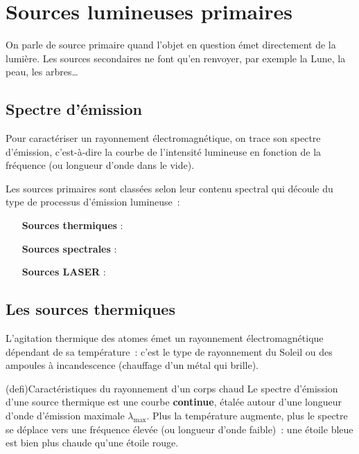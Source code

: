 \documentclass[../../main/main.tex]{subfiles}
\begin{document}
\section{Sources lumineuses primaires}

On parle de source primaire quand l'objet en question émet directement de la
lumière. Les sources secondaires ne font qu'en renvoyer, par exemple la Lune, la
peau, les arbres…

\subsection{Spectre d'émission}

Pour caractériser un rayonnement électromagnétique, on trace son spectre
d'émission, c'est-à-dire la courbe de l'intensité lumineuse en fonction de la
fréquence (ou longueur d'onde dans le vide).

Les sources primaires sont classées selon leur contenu spectral
qui découle du type de processus d'émission lumineuse~:
\begin{itemize}[leftmargin=120pt]
	\item[\textbf{Sources thermiques}] : 
	\item[\textbf{Sources spectrales}] : 
	\item[\textbf{Sources LASER}] : 
\end{itemize}

\subsection{Les sources thermiques}

L'agitation thermique des atomes émet un rayonnement électromagnétique dépendant
de sa température~: c'est le type de rayonnement du Soleil ou des ampoules à
incandescence (chauffage d'un métal qui brille).

\begin{tcb}(defi){Caractéristiques du rayonnement d'un corps chaud}
	Le spectre d'émission d'une source thermique est une courbe
	\textbf{continue}, étalée autour d'une longueur d'onde d'émission maximale
	$\lambda_{\max}$. Plus la température augmente, plus le spectre se déplace vers
	une fréquence élevée (ou longueur d'onde faible)~: une étoile bleue est bien
	plus chaude qu'une étoile rouge.
\end{tcb}
\end{document}

